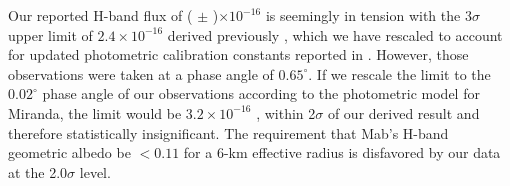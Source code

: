 \documentclass[preprint]{aastex631}
\begin{document}
Our reported H-band flux of 
( $\pm$ )$\times10^{-16}$ \ergsec{} 
is seemingly in tension with the 3$\sigma$ upper limit of $2.4 \times 10^{-16}$ \ergsec{} derived previously \citep[][]{paradis19}, which we have rescaled to account for updated photometric calibration constants reported in \citet{paradis23}. However, those observations were taken at a phase angle of $0.65^\circ$. If we rescale the limit to the $0.02^\circ$ phase angle of our observations according to the \citet{karkoschka01} photometric model for Miranda, the limit would be $3.2 \times 10^{-16}$ \ergsec{}, within 2$\sigma$ of our derived result and therefore statistically insignificant. The \citet{paradis23} requirement that Mab's H-band geometric albedo be $<0.11$ for a 6-km effective radius is disfavored by our data at the 2.0$\sigma$ level.

\end{document}
